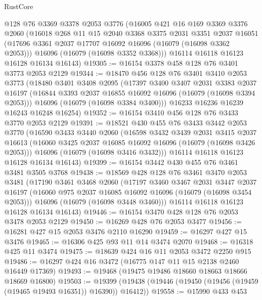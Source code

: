 \begin{lexlean}{RustCore}
\begin{coremodule}
    @128
    @76
    @3369
    @3378
    @2053
    @3776
    (@16005
      @421
      @16
      @169
      @3369
      @3376
      @2060
      (@16018
        @268
        @11
        @15
        @2040
        @3368
        @3375
        @2031
        @3351
        @2037
        @16051
        (@17696 @3361 @2037 @17707 @16092 @16096 (@16079 (@16098 @3362 @2053)))
        @16096
        (@16079 (@16098 @3352 @3368)))
      @16114
      @16118
      @16123
      @16128
      @16134
      @16143)
@19305 := @16154 @3378 @458 @128 @76 @3401 @3773 @2053 @2129
@19344 := @18470
    @456
    @128
    @76
    @3401
    @3410
    @2053
    @3773
    (@18480
      @3401
      @3408
      @2095
      (@17397
        @3400
        @3407
        @2031
        @3383
        @2037
        @16197
        (@16844 @3393 @2037 @16855 @16092 @16096 (@16079 (@16098 @3394 @2053)))
        @16096
        (@16079 (@16098 @3384 @3400)))
      @16233
      @16236
      @16239
      @16243
      @16248
      @16254)
@19352 := @16154 @3410 @456 @128 @76 @3433 @3770 @2053 @2129
@19391 := @18521
    @430
    @455
    @76
    @3433
    @3442
    @2053
    @3770
    (@16590
      @3433
      @3440
      @2060
      (@16598
        @3432
        @3439
        @2031
        @3415
        @2037
        @16613
        (@16060 @3425 @2037 @16085 @16092 @16096 (@16079 (@16098 @3426 @2053)))
        @16096
        (@16079 (@16098 @3416 @3432)))
      @16114
      @16118
      @16123
      @16128
      @16134
      @16143)
@19399 := @16154 @3442 @430 @455 @76 @3461 @3481 @3505 @3768
@19438 := @18569
    @428
    @128
    @76
    @3461
    @3470
    @2053
    @3481
    (@17190
      @3461
      @3468
      @2060
      (@17197
        @3460
        @3467
        @2031
        @3447
        @2037
        @16197
        (@16060 @975 @2037 @16085 @16092 @16096 (@16079 (@16098 @3454 @2053)))
        @16096
        (@16079 (@16098 @3448 @3460)))
      @16114
      @16118
      @16123
      @16128
      @16134
      @16143)
@19446 := @16154 @3470 @428 @128 @76 @2053 @3478 @2053 @2129
@19450 := @16269 @428 @76 @2053 @3477
@19456 := @16281 @427 @15 @2053 @3476 @2110 @16290
@19459 := @16297 @427 @15 @3476
@19465 := @16306 @425 @93 @11 @14 @3474 @2070
@19468 := @16318 @425 @11 @3474
@19475 := @18639 @424 @16 @11 @2053 @3472 @2250 @915
@19486 := @16297 @424 @16 @3472 (@16775 @147 @11 @15 @2138 @2460 @16449 @17369)
@19493 := @19468 (@19475 @19486 @18660 @18663 @18666 @18669 @16800)
@19503 := @19399 (@19438 (@19446 (@19450 (@19456 (@19459 (@19465 @19493 @16351)) @16390)) @16412))
@19558 := @15990
    @433
    @453

\end{coremodule}
\end{lexlean}
